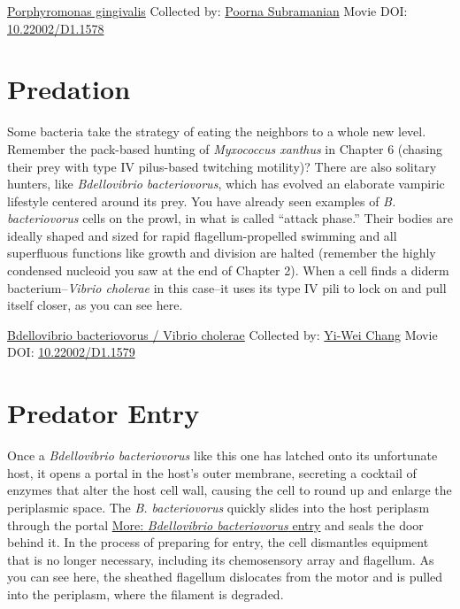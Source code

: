 \documentclass[]{tufte-book}
\begin{document}
\hypertarget{htmlwidget-92825a882fa2d0190c77}{}

\label{fig:9-8}\protect\hyperlink{tree}{Porphyromonas gingivalis} Collected by: \protect\hyperlink{poorna_subramanian}{Poorna Subramanian} Movie DOI: \href{https://doi.org/10.22002/D1.1578}{10.22002/D1.1578}

\hypertarget{predation}{%
\section{Predation}\label{predation}}

Some bacteria take the strategy of eating the neighbors to a whole new level. Remember the pack-based hunting of \emph{Myxococcus xanthus} in Chapter 6 (chasing their prey with type IV pilus-based twitching motility)? There are also solitary hunters, like \emph{Bdellovibrio bacteriovorus}, which has evolved an elaborate vampiric lifestyle centered around its prey. You have already seen examples of \emph{B. bacteriovorus} cells on the prowl, in what is called ``attack phase.'' Their bodies are ideally shaped and sized for rapid flagellum-propelled swimming and all superfluous functions like growth and division are halted (remember the highly condensed nucleoid you saw at the end of Chapter 2). When a cell finds a diderm bacterium--\emph{Vibrio cholerae} in this case--it uses its type IV pili to lock on and pull itself closer, as you can see here.



\hypertarget{htmlwidget-92075c59804c38e0e5b2}{}

\label{fig:9-9}\protect\hyperlink{tree}{Bdellovibrio bacteriovorus / Vibrio cholerae} Collected by: \protect\hyperlink{yi-wei_chang}{Yi-Wei Chang} Movie DOI: \href{https://doi.org/10.22002/D1.1579}{10.22002/D1.1579}

\hypertarget{predator-entry}{%
\section{Predator Entry}\label{predator-entry}}

Once a \emph{Bdellovibrio bacteriovorus} like this one has latched onto its unfortunate host, it opens a portal in the host's outer membrane, secreting a cocktail of enzymes that alter the host cell wall, causing the cell to round up and enlarge the periplasmic space. The \emph{B. bacteriovorus} quickly slides into the host periplasm through the portal \protect\hyperlink{ux2aBdellovibrio_bacteriovorusux2a_entry}{More: \emph{Bdellovibrio bacteriovorus} entry} and seals the door behind it. In the process of preparing for entry, the cell dismantles equipment that is no longer necessary, including its chemosensory array and flagellum. As you can see here, the sheathed flagellum dislocates from the motor and is pulled into the periplasm, where the filament is degraded.
\end{document}
